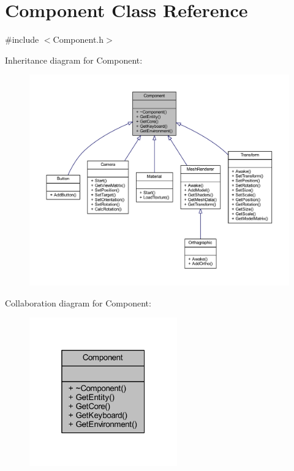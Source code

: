 \hypertarget{class_component}{}\section{Component Class Reference}
\label{class_component}


{\ttfamily \#include $<$Component.\+h$>$}



Inheritance diagram for Component\+:
\nopagebreak
\begin{figure}[H]
\begin{center}
\leavevmode
\includegraphics[width=350pt]{class_component__inherit__graph}
\end{center}
\end{figure}


Collaboration diagram for Component\+:
\nopagebreak
\begin{figure}[H]
\begin{center}
\leavevmode
\includegraphics[width=181pt]{class_component__coll__graph}
\end{center}
\end{figure}
